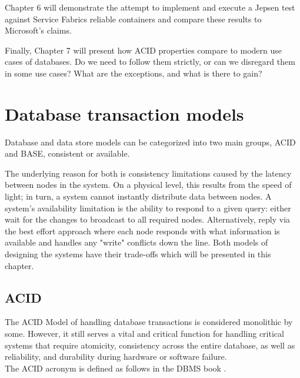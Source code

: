 \documentclass[a4paper,10pt,titlepage]{report}
\begin{document}
    Chapter 6 will demonstrate the attempt to implement and execute a Jepsen test against Service Fabrics reliable containers and compare these results to Microsoft's claims.\\
    \vspace{5mm}

    Finally, Chapter 7 will present how ACID properties compare to modern use cases of databases. Do we need to follow them strictly, or can we disregard them in some use cases? What are the exceptions, and what is there to gain?\\

    \chapter{Database transaction models}

    Database and data store models can be categorized into two main groups, ACID and BASE, consistent or available.

    The underlying reason for both is consistency limitations caused by the latency between nodes in the system. On a physical level, this results from the speed of light; in turn, a system cannot instantly distribute data between nodes. A system's availability limitation is the ability to respond to a given query: either wait for the changes to broadcast to all required nodes. Alternatively, reply via the best effort approach where each node responds with what information is available and handles any "write" conflicts down the line. Both models of designing the systems have their trade-offs which will be presented in this chapter.


    \section{ACID}
    The ACID Model of handling database transactions is considered monolithic by some. However, it still serves a vital and critical function for handling critical systems that require atomicity, consistency across the entire database, as well as reliability, and durability during hardware or software failure.\\
    \vspace{5mm}
    The ACID acronym is defined as follows in the DBMS book \cite{DBMSbook}.
\end{document}
